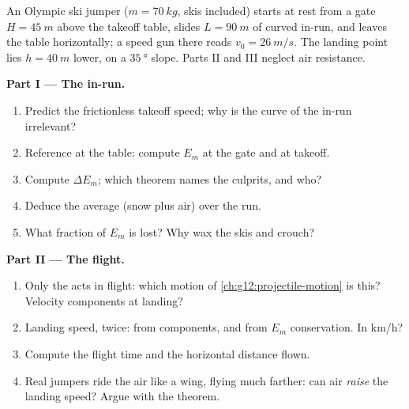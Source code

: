 \begin{problem}
\label{pb:g12:work-and-energy:1}
An Olympic ski jumper ($m = \qty{70}{kg}$, skis included) starts at
rest from a gate $H = \qty{45}{m}$ above the takeoff table, slides
$L = \qty{90}{m}$ of curved in-run, and leaves the table horizontally;
a speed gun there reads $v_0 = \qty{26}{m/s}$. The landing point lies
$h = \qty{40}{m}$ lower, on a $\qty{35}{\degree}$ slope. Parts II
and III neglect air resistance.

\medskip\noindent\textbf{Part I --- The in-run.}
\begin{enumerate}
  \item Predict the frictionless takeoff speed; why is the curve of
        the in-run irrelevant?
  \item Reference at the table: compute $E_m$ at the gate and at takeoff.
  \item Compute $\Delta E_m$; which theorem names the culprits, and who?
  \item Deduce the average   (snow plus air) over the run.
  \item What fraction of $E_m$ is lost? Why wax the skis and crouch?
\end{enumerate}

\medskip\noindent\textbf{Part II --- The flight.}
\begin{enumerate}[resume]
  \item Only the  acts in flight: which motion of
        \cref{ch:g12:projectile-motion} is this? Velocity components
        at landing?
  \item Landing speed, twice: from components, and from $E_m$
        conservation. In \unit{km/h}?
  \item Compute the flight time and the horizontal distance flown.
  \item Real jumpers ride the air like a wing, flying much farther:
        can air \emph{raise} the landing speed? Argue with the
         theorem.
\end{enumerate}


\end{problem}
